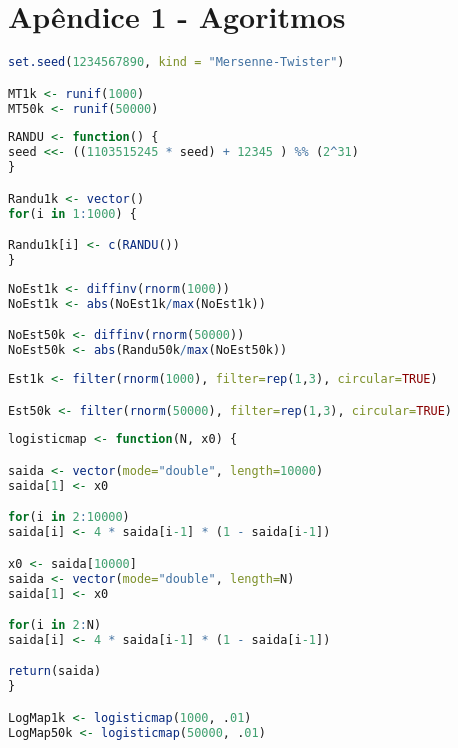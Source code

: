 \appendix

\chapter{Apêndice 1 - Agoritmos}\label{codigo}


\begin{lstlisting}[language=R, caption={Mersenne Twister}, label=code:MersenneTwister]
set.seed(1234567890, kind = "Mersenne-Twister")

MT1k <- runif(1000)
MT50k <- runif(50000)
\end{lstlisting}

\begin{lstlisting}[language=R, caption={Randu}, label={code:Randu}]
RANDU <- function() {
seed <<- ((1103515245 * seed) + 12345 ) %% (2^31)
}

Randu1k <- vector()
for(i in 1:1000) {

Randu1k[i] <- c(RANDU())
}
\end{lstlisting}


\begin{lstlisting}[language=R, caption={Não Estacionária}, label={code:NaoEstacionaria}]
NoEst1k <- diffinv(rnorm(1000))
NoEst1k <- abs(NoEst1k/max(NoEst1k))

NoEst50k <- diffinv(rnorm(50000))
NoEst50k <- abs(Randu50k/max(NoEst50k))
\end{lstlisting}


\begin{lstlisting}[language=R, caption={Estacionária}, label={code:Estacionaria}]
Est1k <- filter(rnorm(1000), filter=rep(1,3), circular=TRUE)

Est50k <- filter(rnorm(50000), filter=rep(1,3), circular=TRUE)
\end{lstlisting}


\begin{lstlisting}[language=R, caption={Mapa Logístico}, label={code:MapaLogistico}]
logisticmap <- function(N, x0) {

saida <- vector(mode="double", length=10000)
saida[1] <- x0

for(i in 2:10000)
saida[i] <- 4 * saida[i-1] * (1 - saida[i-1])

x0 <- saida[10000]
saida <- vector(mode="double", length=N)
saida[1] <- x0

for(i in 2:N)
saida[i] <- 4 * saida[i-1] * (1 - saida[i-1])

return(saida)
}

LogMap1k <- logisticmap(1000, .01)
LogMap50k <- logisticmap(50000, .01)

\end{lstlisting}


\begin{lstlisting}[language=R, caption={}, label={code:}]

\end{lstlisting}
